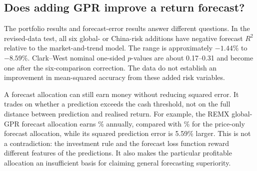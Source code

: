 \subsection{Does adding GPR improve a return forecast?}

The portfolio results and forecast-error results answer different questions. In the revised-data test, all six global- or China-risk additions have negative forecast $R^2$ relative to the market-and-trend model. The range is approximately $-1.44\%$ to $-8.59\%$. Clark–West nominal one-sided $p$-values are about 0.17–0.31 and become one after the six-comparison correction. The data do not establish an improvement in mean-squared accuracy from these added risk variables.

\begin{table}[!htbp]
\centering\footnotesize
\setlength{\tabcolsep}{3.5pt}
\caption{Incremental forecast accuracy and the corresponding allocations}
\label{tab:forecast}

\end{table}

A forecast allocation can still earn money without reducing squared error. It trades on whether a prediction exceeds the cash threshold, not on the full distance between prediction and realised return. For example, the REMX global-GPR forecast allocation earns \OosRemxGlobalForecastCagr\% annually, compared with \OosRemxMarketCagr\% for the price-only forecast allocation, while its squared prediction error is 5.59\% larger. This is not a contradiction: the investment rule and the forecast loss function reward different features of the predictions. It also makes the particular profitable allocation an insufficient basis for claiming general forecasting superiority.

